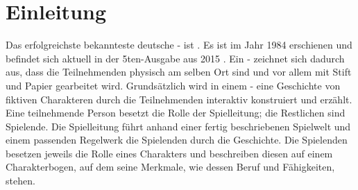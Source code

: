 \chapter{Einleitung}\label{ch:einleitung}

Das erfolgreichste \bzw bekannteste deutsche - ist .
Es ist im Jahr 1984 erschienen und befindet sich aktuell in der 5ten-Ausgabe aus 2015 .
Ein - zeichnet sich \insb dadurch aus, dass die Teilnehmenden physisch am selben Ort sind und vor allem mit Stift und Papier gearbeitet wird.
Grundsätzlich wird in einem - eine Geschichte von fiktiven Charakteren durch die Teilnehmenden interaktiv konstruiert und erzählt.
Eine teilnehmende Person besetzt die Rolle der Spielleitung; die Restlichen sind Spielende.
Die Spielleitung führt anhand einer fertig beschriebenen Spielwelt und einem passenden Regelwerk die Spielenden durch die Geschichte.
Die Spielenden besetzen jeweils die Rolle eines Charakters und beschreiben diesen auf einem \sog Charakterbogen, auf dem seine Merkmale, wie \uA dessen Beruf und Fähigkeiten, stehen.
